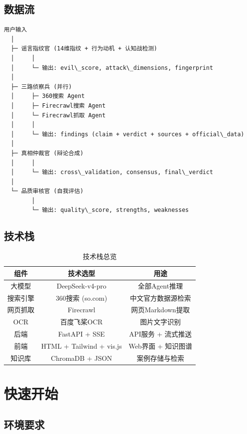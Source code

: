 \documentclass[12pt,a4paper]{ctexart}
\begin{document}
\subsection{数据流}

\begin{verbatim}
用户输入
  │
  ├─ 谣言指纹官 (14维指纹 + 行为动机 + 认知战检测)
  │     │
  │     └─ 输出: evil\_score, attack\_dimensions, fingerprint
  │
  ├─ 三路侦察兵 (并行)
  │     ├─ 360搜索 Agent
  │     ├─ Firecrawl搜索 Agent
  │     └─ Firecrawl抓取 Agent
  │     │
  │     └─ 输出: findings (claim + verdict + sources + official\_data)
  │
  ├─ 真相仲裁官 (辩论合成)
  │     │
  │     └─ 输出: cross\_validation, consensus, final\_verdict
  │
  └─ 品质审核官 (自我评估)
        │
        └─ 输出: quality\_score, strengths, weaknesses
\end{verbatim}

\subsection{技术栈}

\begin{table}[h]
\centering
\begin{tabular}{|c|c|c|}
\hline
\textbf{组件} & \textbf{技术选型} & \textbf{用途} \\
\hline
大模型 & DeepSeek-v4-pro & 全部Agent推理 \\
搜索引擎 & 360搜索 (so.com) & 中文官方数据源检索 \\
网页抓取 & Firecrawl & 网页Markdown提取 \\
OCR & 百度飞桨OCR & 图片文字识别 \\
后端 & FastAPI + SSE & API服务 + 流式推送 \\
前端 & HTML + Tailwind + vis.js & Web界面 + 知识图谱 \\
知识库 & ChromaDB + JSON & 案例存储与检索 \\
\hline
\end{tabular}
\caption{技术栈总览}
\end{table}

\section{快速开始}

\subsection{环境要求}
\end{document}
